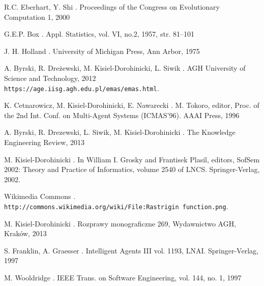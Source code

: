 \begin{thebibliography}{1}
R.C. Eberhart, Y. Shi
.
\newblock Proceedings of the Congress on Evolutionary Computation 1, 2000


G.E.P. Box 
.
\newblock Appl. Statistics, vol. VI, no.2, 1957, str. 81–101


J. H. Holland
.
\newblock  University of Michigan Press, Ann Arbor, 1975


A. Byrski, R. Dreżewski, M. Kisiel-Dorohinicki, L. Siwik
.
\newblock  AGH University of Science and Technology, 2012
\newblock \\\texttt{https://age.iisg.agh.edu.pl/emas/emas.html}.


K. Cetnarowicz, M. Kisiel-Dorohinicki, E. Nawarecki
.
\newblock  M. Tokoro, editor, Proc. of the 2nd Int. Conf. on Multi-Agent Systems (ICMAS'96). AAAI Press, 1996


 A. Byrski, R. Drezewski, L. Siwik, M. Kisiel-Dorohinicki
.
\newblock The Knowledge Engineering Review, 2013


M. Kisiel-Dorohinicki
.
\newblock In William I. Grosky and Frantisek Plasil, editors, SofSem 2002: Theory and Practice of Informatics, volume 2540 of LNCS. Springer-Verlag, 2002.


Wikimedia Commons
.
\newblock \\\texttt{http://commons.wikimedia.org/wiki/File:Rastrigin function.png}.


M. Kisiel-Dorohinicki
.
\newblock Rozprawy monograficzne 269, Wydawnictwo AGH, Kraków, 2013


S. Franklin, A. Graesser
.
\newblock Intelligent Agents III vol. 1193, LNAI. Springer-Verlag, 1997


M. Wooldridge
.
\newblock IEEE Trans. on Software Engineering, vol. 144, no. 1, 1997



\end{thebibliography}
